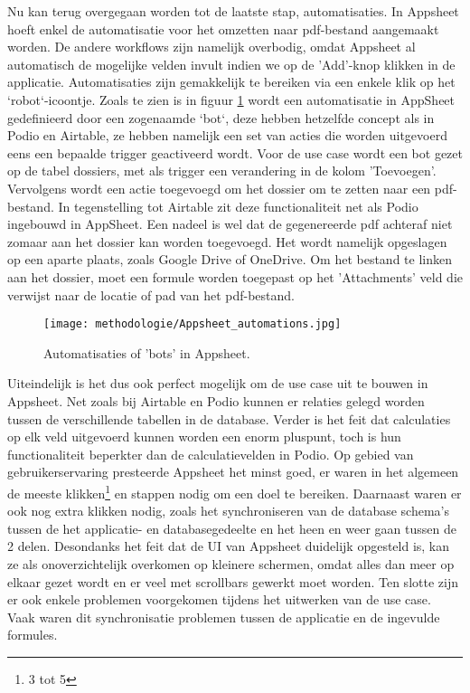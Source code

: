 Nu kan terug overgegaan worden tot de laatste stap, automatisaties. In Appsheet hoeft enkel de automatisatie voor het omzetten naar pdf-bestand aangemaakt worden. De andere workflows zijn namelijk overbodig, omdat Appsheet al automatisch de mogelijke velden invult indien we op de 'Add'-knop klikken in de applicatie. Automatisaties zijn gemakkelijk te bereiken via een enkele klik op het `robot`-icoontje. Zoals te zien is in figuur \ref{fig:meth_appsheet_automations} wordt een automatisatie in AppSheet gedefinieerd door een zogenaamde `bot`, deze hebben hetzelfde concept als in Podio en Airtable, ze hebben namelijk een set van acties die worden uitgevoerd eens een bepaalde trigger geactiveerd wordt. Voor de use case wordt een bot gezet op de tabel dossiers, met als trigger een verandering in de kolom 'Toevoegen'.
Vervolgens wordt een actie toegevoegd om het dossier om te zetten naar een pdf-bestand. In tegenstelling tot Airtable zit deze functionaliteit net als Podio ingebouwd in AppSheet. Een nadeel is wel dat de gegenereerde pdf achteraf niet zomaar aan het dossier kan worden toegevoegd. Het wordt namelijk opgeslagen op een aparte plaats, zoals Google Drive of OneDrive. Om het bestand te linken aan het dossier, moet een formule worden toegepast op het 'Attachments' veld die verwijst naar de locatie of pad van het pdf-bestand. \\


\begin{figure}[ht]
    \centering
    \texttt{[image: methodologie/Appsheet\_automations.jpg]}
    \caption{Automatisaties of 'bots' in Appsheet.}
    \label{fig:meth_appsheet_automations}
\end{figure}


Uiteindelijk is het dus ook perfect mogelijk om de use case uit te bouwen in Appsheet. Net zoals bij Airtable en Podio kunnen er relaties gelegd worden tussen de verschillende tabellen in de database. Verder is het feit dat calculaties op elk veld uitgevoerd kunnen worden een enorm pluspunt, toch is hun functionaliteit beperkter dan de calculatievelden in Podio. Op gebied van gebruikerservaring presteerde Appsheet het minst goed, er waren in het algemeen de meeste klikken\footnote{3 tot 5} en stappen nodig om een doel te bereiken. Daarnaast waren er ook nog extra klikken nodig, zoals het synchroniseren van de database schema's tussen de het applicatie- en databasegedeelte en het heen en weer gaan tussen de 2 delen. Desondanks het feit dat de UI van Appsheet duidelijk opgesteld is, kan ze als onoverzichtelijk overkomen op kleinere schermen, omdat alles dan meer op elkaar gezet wordt en er veel met scrollbars gewerkt moet worden. Ten slotte zijn er ook enkele problemen voorgekomen tijdens het uitwerken van de use case. Vaak waren dit synchronisatie problemen tussen de applicatie en de ingevulde formules. \\


